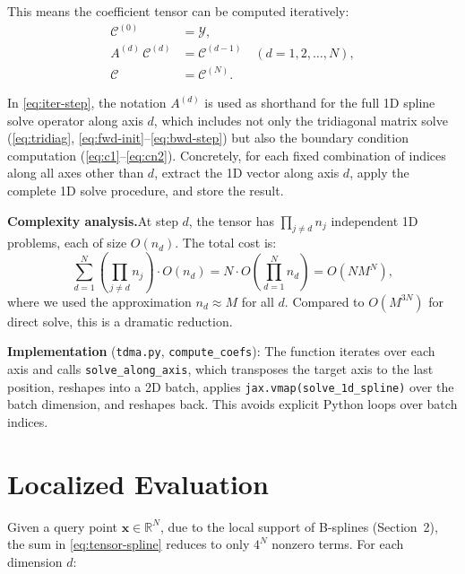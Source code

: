 \documentclass[11pt,a4paper]{article}
\begin{document}
This means the coefficient tensor can be computed iteratively:
\begin{align}
  \mathcal{C}^{(0)} &= \mathcal{Y}, \label{eq:iter-init} \\
  A^{(d)} \, \mathcal{C}^{(d)} &= \mathcal{C}^{(d-1)}
    \quad (d = 1, 2, \ldots, N), \label{eq:iter-step} \\
  \mathcal{C} &= \mathcal{C}^{(N)}. \label{eq:iter-final}
\end{align}

In \eqref{eq:iter-step}, the notation $A^{(d)}$ is used as shorthand for
the full 1D spline solve operator along axis $d$, which includes not only
the tridiagonal matrix solve (\eqref{eq:tridiag},
\eqref{eq:fwd-init}--\eqref{eq:bwd-step}) but also the boundary condition
computation (\eqref{eq:c1}--\eqref{eq:cn2}). Concretely, for each fixed
combination of indices along all axes other than $d$, extract the 1D
vector along axis $d$, apply the complete 1D solve procedure, and store
the result.

\textbf{Complexity analysis.}\quad At step $d$, the tensor has
$\prod_{j \ne d} n_j$ independent 1D problems, each of size $O(n_d)$.
The total cost is:
\begin{equation}\label{eq:complexity}
  \sum_{d=1}^{N} \left(\prod_{j \ne d} n_j\right) \cdot O(n_d)
  = N \cdot O\!\left(\prod_{d=1}^{N} n_d\right)
  = O(N M^N),
\end{equation}
where we used the approximation $n_d \approx M$ for all $d$. Compared to
$O(M^{3N})$ for direct solve, this is a dramatic reduction.

\textbf{Implementation} (\texttt{tdma.py}, \texttt{compute\_coefs}): The
function iterates over each axis and calls \texttt{solve\_along\_axis},
which transposes the target axis to the last position, reshapes into a 2D
batch, applies \texttt{jax.vmap(solve\_1d\_spline)} over the batch
dimension, and reshapes back. This avoids explicit Python loops over batch
indices.

\section{Localized Evaluation}

Given a query point $\mathbf{x} \in \mathbb{R}^N$, due to the local
support of B-splines (Section~2), the sum in \eqref{eq:tensor-spline}
reduces to only $4^N$ nonzero terms. For each dimension $d$:
\end{document}

